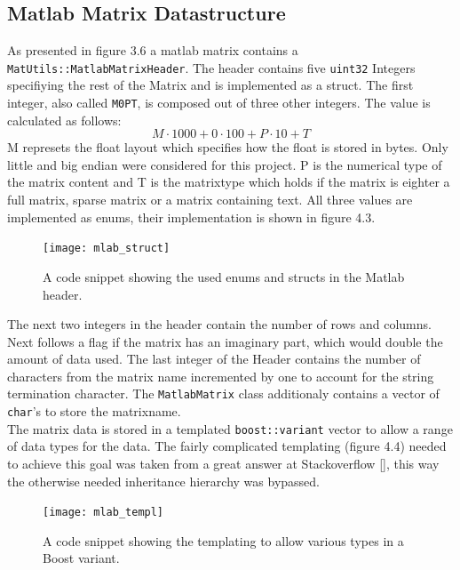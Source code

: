 \subsection{Matlab Matrix Datastructure}
As presented in figure 3.6 a matlab matrix contains a \texttt{MatUtils::MatlabMatrixHeader}. The header contains five \texttt{uint32} Integers specifiying the rest of the Matrix and is implemented as a struct. The first integer, also called \texttt{M0PT}, is composed out of three other integers. The value is calculated as follows:
$$M\cdot1000 + 0 \cdot 100 + P\cdot 10 + T$$
M represets the float layout which specifies how the float is stored in bytes. Only little and big endian were considered for this project. P is the numerical type of the matrix content and T is the matrixtype which holds if the matrix is eighter a full matrix, sparse matrix or a matrix containing text. All three values are implemented as enums, their implementation is shown in figure 4.3.
\begin{figure}[h]
\centering
      \texttt{[image: mlab\_struct]}
        \caption{A code snippet showing the used enums and structs in the Matlab header.}
\end{figure}
The next two integers in the header contain the number of rows and columns. Next follows a flag if the matrix has an imaginary part, which would double the amount of data used. The last integer of the Header contains the number of characters from the matrix name incremented by one to account for the string termination character.
The \texttt{MatlabMatrix} class additionaly contains a vector of \texttt{char}'s to store the matrixname.\\
The matrix data is stored in a templated \texttt{boost::variant} vector to allow a range of data types for the data. The fairly complicated templating (figure 4.4) needed to achieve this goal was taken from  a great answer at Stackoverflow [], this way the otherwise needed inheritance hierarchy was bypassed. 
\begin{figure}[h]
\centering
      \texttt{[image: mlab\_templ]}
        \caption{A code snippet showing the templating to allow various types in a Boost variant.}
\end{figure}
